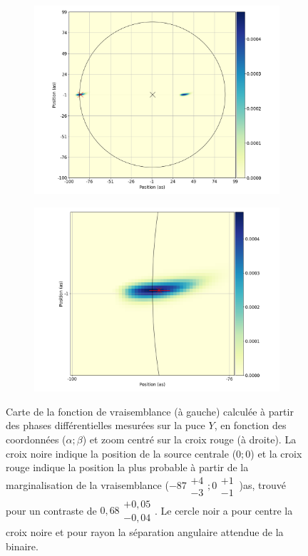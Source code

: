 \begin{figure}[ht!]
    \centering
    \begin{subfigure}{0.5\textwidth}
        \centering
        \includegraphics[width=\textwidth]{Figure_Chap4/20221010_Bin01_SpeDiffPhase_FitLikeli_Map_Pola1_LaTex.png}
    \end{subfigure}%
    \begin{subfigure}{0.5\textwidth}
        \centering
        \includegraphics[width=\textwidth]{Figure_Chap4/20221010_Bin01_SpeDiffPhase_FitLikeli_MapZoom_Pola1_LaTex.png}
    \end{subfigure}
    \caption[Carte de la fonction de vraisemblance calculée à partir des phases différentielles mesurées sur la puce $Y$.]{Carte de la fonction de vraisemblance (à gauche) calculée à partir des phases différentielles mesurées sur la puce $Y$, en fonction des coordonnées ($\alpha; \beta$) et zoom centré sur la croix rouge (à droite). La croix noire indique la position de la source centrale ($0; 0$) et la croix rouge indique la position la plus probable à partir de la marginalisation de la vraisemblance ($-87\substack{+4 \\ -3}; 0\substack{+1 \\ -1} \,$)as, trouvé pour un contraste de $0,68\substack{+0,05 \\ -0,04}$. Le cercle noir a pour centre la croix noire et pour rayon la séparation angulaire attendue de la binaire.}

\end{figure}
